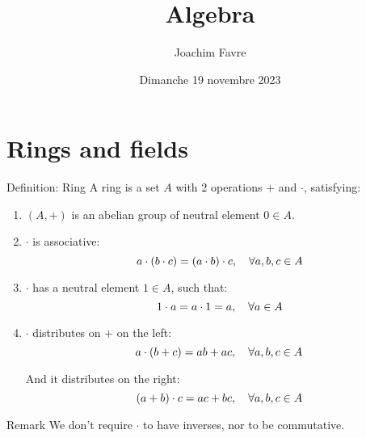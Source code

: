 \documentclass[a4paper]{article}
\title{Algebra}
\author{Joachim Favre}
\date{Dimanche 19 novembre 2023}
\begin{document}
\maketitle


\section{Rings and fields}

\begin{parag}{Definition: Ring}
    A ring is a set $A$ with 2 operations $+$ and $\cdot $, satisfying:
    \begin{enumerate}
        \item $\left(A, +\right)$ is an abelian group of neutral element $0 \in A$.
        \item $\cdot $ is associative: 
        \[a\cdot \left(b\cdot c\right) = \left(a\cdot b\right)\cdot c, \mathspace \forall a,b,c \in A\]
        \item $\cdot $ has a neutral element $1 \in A$, such that:
        \[1\cdot a = a\cdot 1 = a, \quad \forall a \in A\]
        \item $\cdot $ distributes on $+$ on the left: 
        \[a\cdot \left(b+c\right) =  ab + ac, \mathspace \forall a, b, c \in A\]

        And it distributes on the right: 
        \[\left(a + b\right)\cdot c = ac + bc, \mathspace \forall a, b, c \in A\]
    \end{enumerate}
    
    \begin{subparag}{Remark}
        We don't require $\cdot $ to have inverses, nor to be commutative.
    \end{subparag}
\end{parag}
\end{document}
